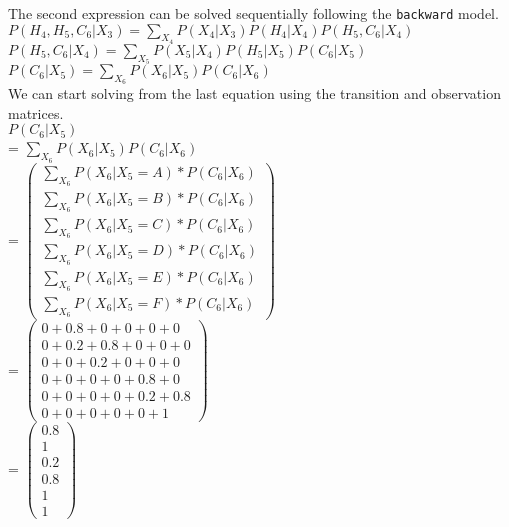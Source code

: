 \documentclass{article}
\begin{document}
\noindent
The second expression can be solved sequentially following the \texttt{backward} model. \\ 

\noindent
$P(H_4, H_5, C_6 \vert X_3) = \sum_{X_4} P(X_4 \vert X_3) P(H_4 \vert X_4) P(H_5, C_6 \vert X_4)$ \\ 

\noindent
$P(H_5, C_6 \vert X_4) = \sum_{X_5} P(X_5 \vert X_4) P(H_5 \vert X_5) P(C_6 \vert X_5)$ \\ 

\noindent
$P(C_6 \vert X_5) = \sum_{X_6} P(X_6 \vert X_5) P(C_6 \vert X_6)$ \\ 

\noindent
We can start solving from the last equation using the transition and observation matrices. \\ 

\noindent 
$P(C_6 \vert X_5)$ \\ 

\indent 
= $\sum_{X_6} P(X_6 \vert X_5) P(C_6 \vert X_6)$ \\ 

\indent 
= $\left(\begin{array}{c} 
        \sum_{X_6} P(X_6 \vert X_5 = A) * P(C_6 \vert X_6)\\
        \sum_{X_6} P(X_6 \vert X_5 = B) * P(C_6 \vert X_6) \\ 
        \sum_{X_6} P(X_6 \vert X_5 = C) * P(C_6 \vert X_6) \\
        \sum_{X_6} P(X_6 \vert X_5 = D) * P(C_6 \vert X_6) \\
        \sum_{X_6} P(X_6 \vert X_5 = E) * P(C_6 \vert X_6) \\
        \sum_{X_6} P(X_6 \vert X_5 = F) * P(C_6 \vert X_6)
    \end{array}\right)$ \\ 
\indent 
= $\left(\begin{array}{c} 
        0 + 0.8 + 0 + 0 + 0 + 0 \\
        0 + 0.2 + 0.8 + 0 + 0 + 0 \\ 
        0 + 0 + 0.2 + 0 + 0 + 0\\
        0 + 0 + 0 + 0 + 0.8 + 0\\
        0 + 0 + 0 + 0 + 0.2 + 0.8 \\
        0 + 0 + 0 + 0 + 0 + 1
    \end{array}\right)$ \\
\indent 
= $\left(\begin{array}{c} 
        0.8 \\
        1 \\ 
        0.2 \\
        0.8 \\
        1 \\
        1
    \end{array}\right)$ \\ 
\\ 
\end{document}
